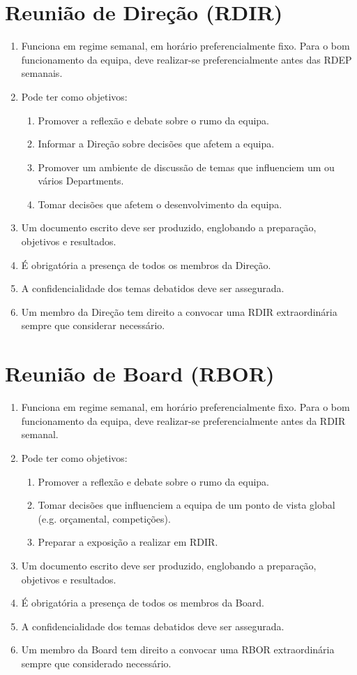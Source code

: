 \section{Reunião de Direção (RDIR)}
\begin{enumerate}
  \item Funciona em regime semanal, em horário preferencialmente fixo. Para o bom funcionamento da equipa, deve realizar-se preferencialmente antes das RDEP semanais.
  \item Pode ter como objetivos:
  \begin{enumerate}
    \item Promover a reflexão e debate sobre o rumo da equipa.
    \item Informar a Direção sobre decisões que afetem a equipa.
    \item Promover um ambiente de discussão de temas que influenciem um ou vários Departments.
    \item Tomar decisões que afetem o desenvolvimento da equipa.
  \end{enumerate}
  \item Um documento escrito deve ser produzido, englobando a preparação, objetivos e resultados.
  \item É obrigatória a presença de todos os membros da Direção.
  \item A confidencialidade dos temas debatidos deve ser assegurada.
  \item Um membro da Direção tem direito a convocar uma RDIR extraordinária sempre que considerar necessário.
\end{enumerate}

\section{Reunião de Board (RBOR)}
\begin{enumerate}
  \item Funciona em regime semanal, em horário preferencialmente fixo. Para o bom funcionamento da equipa, deve realizar-se preferencialmente antes da RDIR semanal.
  \item Pode ter como objetivos:
  \begin{enumerate}
    \item Promover a reflexão e debate sobre o rumo da equipa.
    \item Tomar decisões que influenciem a equipa de um ponto de vista global (e.g. orçamental, competições).
    \item Preparar a exposição a realizar em RDIR.
  \end{enumerate}
  \item Um documento escrito deve ser produzido, englobando a preparação, objetivos e resultados.
  \item É obrigatória a presença de todos os membros da Board.
  \item A confidencialidade dos temas debatidos deve ser assegurada.
  \item Um membro da Board tem direito a convocar uma RBOR extraordinária sempre que considerado necessário.
\end{enumerate}
